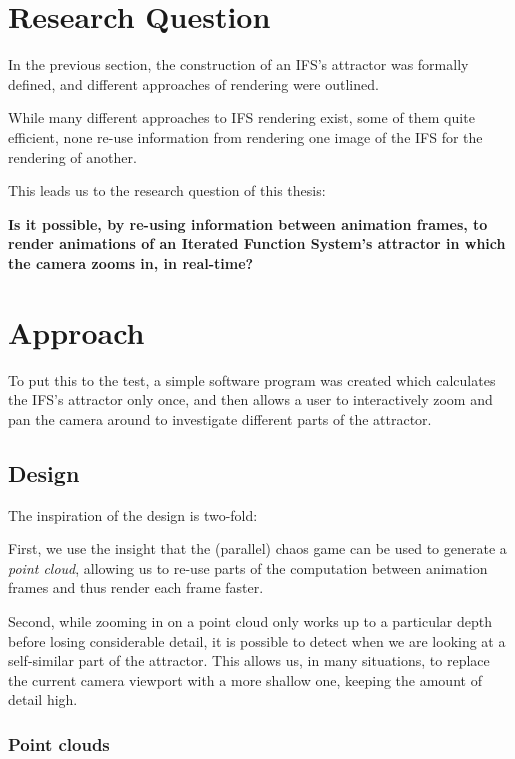\documentclass[11pt]{article}
\begin{document}
\section{Research Question}
\label{sec:orgdbf9234}
\label{section:research_question}

In the previous section, the construction of an IFS's attractor was formally defined, 
and different approaches of rendering were outlined.

While many different approaches to IFS rendering exist, some of them quite efficient,
none re-use information from rendering one image of the IFS for the rendering of another.

This leads us to the research question of this thesis:

\textbf{\textbf{Is it possible, by re-using information between animation frames, 
to render animations of an Iterated Function System's attractor in which the camera zooms in, in real-time?}}

\section{Approach}
\label{sec:org26f3388}
\label{section:approach}

To put this to the test, a simple software program was created which calculates the IFS's attractor only once,
and then allows a user to interactively zoom and pan the camera around to investigate different parts of the attractor.

\subsection{Design}
\label{sec:orgaab2a08}

The inspiration of the design is two-fold:

First, we use the insight that the (parallel) chaos game can be used to generate a \emph{point cloud}, allowing us to re-use parts of the computation between animation frames
and thus render each frame faster.

Second, while zooming in on a point cloud only works up to a particular depth before losing considerable detail, 
it is possible to detect when we are looking at a self-similar part of the attractor.
This allows us, in many situations, to replace the current camera viewport with a more shallow one, 
keeping the amount of detail high.

\subsubsection{Point clouds}
\label{sec:org95f2603}
\end{document}
